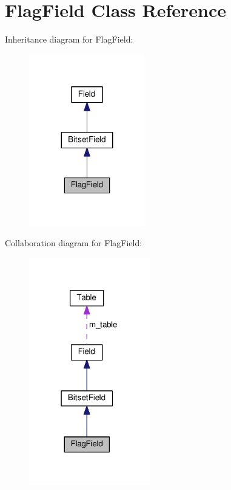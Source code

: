 \hypertarget{classFlagField}{}\section{Flag\+Field Class Reference}
\label{classFlagField}


Inheritance diagram for Flag\+Field\+:\nopagebreak
\begin{figure}[H]
\begin{center}
\leavevmode
\includegraphics[width=143pt]{classFlagField__inherit__graph}
\end{center}
\end{figure}


Collaboration diagram for Flag\+Field\+:\nopagebreak
\begin{figure}[H]
\begin{center}
\leavevmode
\includegraphics[width=150pt]{classFlagField__coll__graph}
\end{center}
\end{figure}
